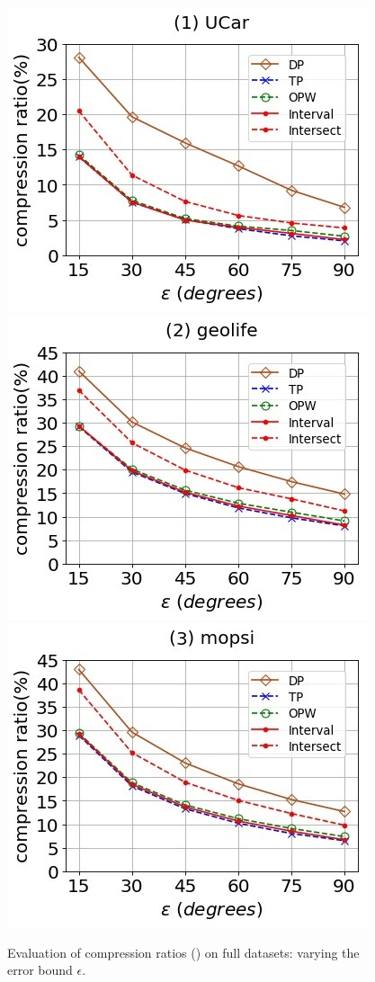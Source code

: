 \begin{figure}[tb!]
	\centering
	\includegraphics[scale=0.500]{Figures/Exp-DAD-CR-epsilon-service.jpg} 	\hspace{2ex}
	\includegraphics[scale=0.500]{Figures/Exp-DAD-CR-epsilon-geolife.jpg}	\hspace{2ex}
	\includegraphics[scale=0.500]{Figures/Exp-DAD-CR-epsilon-mopsi.jpg}		
	\vspace{-2ex}
	\caption{\small Evaluation of compression ratios (\dad) on full datasets: varying the error bound $\epsilon$.}
	\label{fig:cr-dad-epsilon}
	\vspace{-2ex}
\end{figure}

